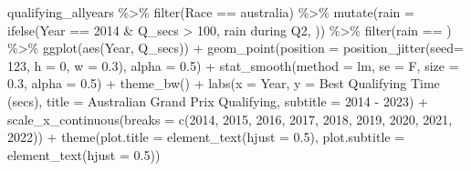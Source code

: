 \documentclass[
]{book}
\newenvironment{Shaded}{\begin{snugshade}}{\end{snugshade}}
\newcommand{\AttributeTok}[1]{\textcolor[rgb]{0.77,0.63,0.00}{#1}}
\newcommand{\DecValTok}[1]{\textcolor[rgb]{0.00,0.00,0.81}{#1}}
\newcommand{\FloatTok}[1]{\textcolor[rgb]{0.00,0.00,0.81}{#1}}
\newcommand{\FunctionTok}[1]{\textcolor[rgb]{0.00,0.00,0.00}{#1}}
\newcommand{\NormalTok}[1]{#1}
\newcommand{\SpecialCharTok}[1]{\textcolor[rgb]{0.00,0.00,0.00}{#1}}
\newcommand{\StringTok}[1]{\textcolor[rgb]{0.31,0.60,0.02}{#1}}
\begin{document}
\begin{Shaded}
\begin{Highlighting}[]
\NormalTok{qualifying\_allyears }\SpecialCharTok{\%\textgreater{}\%}
  \FunctionTok{filter}\NormalTok{(Race }\SpecialCharTok{==} \StringTok{\textquotesingle{}australia\textquotesingle{}}\NormalTok{) }\SpecialCharTok{\%\textgreater{}\%}
  \FunctionTok{mutate}\NormalTok{(}\AttributeTok{rain =} \FunctionTok{ifelse}\NormalTok{(Year }\SpecialCharTok{==} \DecValTok{2014} \SpecialCharTok{\&}\NormalTok{ Q\_secs }\SpecialCharTok{\textgreater{}} \DecValTok{100}\NormalTok{, }\StringTok{\textquotesingle{}rain during Q2\textquotesingle{}}\NormalTok{, }\StringTok{\textquotesingle{} \textquotesingle{}}\NormalTok{)) }\SpecialCharTok{\%\textgreater{}\%} 
  \FunctionTok{filter}\NormalTok{(rain }\SpecialCharTok{==} \StringTok{\textquotesingle{} \textquotesingle{}}\NormalTok{) }\SpecialCharTok{\%\textgreater{}\%} 
  \FunctionTok{ggplot}\NormalTok{(}\FunctionTok{aes}\NormalTok{(Year, Q\_secs)) }\SpecialCharTok{+}
  \FunctionTok{geom\_point}\NormalTok{(}\AttributeTok{position =} \FunctionTok{position\_jitter}\NormalTok{(}\AttributeTok{seed=} \DecValTok{123}\NormalTok{, }\AttributeTok{h =} \DecValTok{0}\NormalTok{, }\AttributeTok{w =} \FloatTok{0.3}\NormalTok{), }\AttributeTok{alpha =} \FloatTok{0.5}\NormalTok{) }\SpecialCharTok{+}
  \FunctionTok{stat\_smooth}\NormalTok{(}\AttributeTok{method =} \StringTok{\textquotesingle{}lm\textquotesingle{}}\NormalTok{, }\AttributeTok{se =}\NormalTok{ F, }\AttributeTok{size =} \FloatTok{0.3}\NormalTok{, }\AttributeTok{alpha =} \FloatTok{0.5}\NormalTok{) }\SpecialCharTok{+} 
  \FunctionTok{theme\_bw}\NormalTok{() }\SpecialCharTok{+}
  \FunctionTok{labs}\NormalTok{(}\AttributeTok{x =} \StringTok{\textquotesingle{}Year\textquotesingle{}}\NormalTok{,}
       \AttributeTok{y =} \StringTok{\textquotesingle{}Best Qualifying Time (secs)\textquotesingle{}}\NormalTok{,}
       \AttributeTok{title =} \StringTok{\textquotesingle{}Australian Grand Prix Qualifying\textquotesingle{}}\NormalTok{,}
       \AttributeTok{subtitle =} \StringTok{\textquotesingle{}2014 {-} 2023\textquotesingle{}}\NormalTok{) }\SpecialCharTok{+}
  \FunctionTok{scale\_x\_continuous}\NormalTok{(}\AttributeTok{breaks =} \FunctionTok{c}\NormalTok{(}\DecValTok{2014}\NormalTok{, }\DecValTok{2015}\NormalTok{, }\DecValTok{2016}\NormalTok{, }\DecValTok{2017}\NormalTok{, }\DecValTok{2018}\NormalTok{, }\DecValTok{2019}\NormalTok{, }\DecValTok{2020}\NormalTok{, }\DecValTok{2021}\NormalTok{, }\DecValTok{2022}\NormalTok{)) }\SpecialCharTok{+}
  \FunctionTok{theme}\NormalTok{(}\AttributeTok{plot.title =} \FunctionTok{element\_text}\NormalTok{(}\AttributeTok{hjust =} \FloatTok{0.5}\NormalTok{),}
        \AttributeTok{plot.subtitle =} \FunctionTok{element\_text}\NormalTok{(}\AttributeTok{hjust =} \FloatTok{0.5}\NormalTok{))}
\end{Highlighting}
\end{Shaded}
\end{document}

